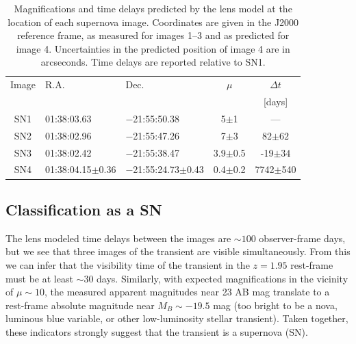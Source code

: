 \documentclass[12pt]{article}
\begin{document}
\begin{table}[tb]
    \centering
    \begin{tabular}{c|l|l|c|c|}
    Image     & R.A. & Dec. & $\mu$ & $\Delta t$ \\
    & & & & [days] \\
\hline 
SN1 & 01:38:03.63     & $-$21:55:50.38         & 5$\pm$1     &  ---\\
SN2 & 01:38:02.96     & $-$21:55:47.26         & 7$\pm$3     & 82$\pm62$ \\
SN3 & 01:38:02.42     & $-$21:55:38.47         & 3.9$\pm$0.5   &   -19$\pm34$ \\
SN4 & 01:38:04.15$\pm$0.36 & $-$21:55:24.73$\pm$0.43 & 0.4$\pm$0.2 & 7742$\pm$540\\
\hline 
\end{tabular}
    \caption{Magnifications and time delays predicted by the lens model at the location of each supernova image. Coordinates are given in the J2000 reference frame, as measured for images 1--3 and as predicted for image 4.  Uncertainties in the predicted position of image 4 are in arcseconds.  Time delays are reported relative to SN1.}
    \label{tab:snpred}
\end{table}


\subsection*{Classification as a SN}
The lens modeled time delays between the images are $\sim100$ observer-frame days, 
but we see that three images of the transient are visible simultaneously.
From this we can infer that the visibility time of the transient in the $z=1.95$ rest-frame must be at least $\sim$30 days. 
Similarly, with expected magnifications in the vicinity of $\mu\sim10$, the measured apparent magnitudes near 23 AB mag translate to a rest-frame absolute magnitude near $M_B \sim-19.5$ mag (too bright to be a nova, luminous blue variable, or other low-luminosity stellar transient).
Taken together, these indicators strongly suggest that the transient is a supernova (SN). 
\end{document}
